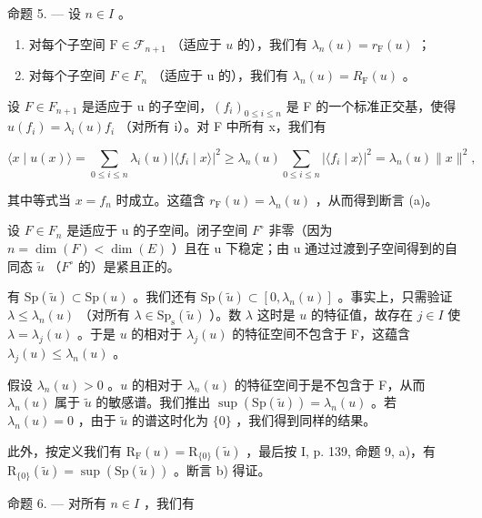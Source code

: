 命题 5. --- 设 \(n \in I\) 。

\begin{enumerate}
\def\labelenumi{\alph{enumi})}
\item
  对每个子空间 \(\mathrm{F} \in \mathcal{F}_{n+1}\) （适应于 \(u\) 的），我们有 \(\lambda_n(u) = r_{\mathrm{F}}(u)\) ；
\item
  对每个子空间 \(F \in F_{n}\) （适应于 u 的），我们有 \(\lambda_{n}(u) = R_{\mathrm{F}}(u)\) 。
\end{enumerate}

设 \(F \in F_{n+1}\) 是适应于 u 的子空间，\((f_i)_{0 \leqslant i \leqslant n}\) 是 F 的一个标准正交基，使得 \(u(f_i) = \lambda_i(u)f_i\) （对所有 i）。对 F 中所有 x，我们有

\[
\langle x \mid u (x) \rangle = \sum_ {0 \leqslant i \leqslant n} \lambda_ {i} (u) | \langle f _ {i} \mid x \rangle | ^ {2} \geqslant \lambda_ {n} (u) \sum_ {0 \leqslant i \leqslant n} | \langle f _ {i} \mid x \rangle | ^ {2} = \lambda_ {n} (u) \| x \| ^ {2},
\]

其中等式当 \(x = f_{n}\) 时成立。这蕴含 \(r_{\mathrm{F}}(u) = \lambda_{n}(u)\) ，从而得到断言 (a)。

设 \(F \in F_{n}\) 是适应于 u 的子空间。闭子空间 \(F^{\circ}\) 非零（因为 \(n = \dim(F) < \dim(E)\) ）且在 u 下稳定；由 u 通过过渡到子空间得到的自同态 \(\widetilde{u}\) （\(F^{\circ}\) 的）是紧且正的。

有 \(\mathrm{Sp}(\widetilde{u})\subset \mathrm{Sp}(u)\) 。我们还有 \(\mathrm{Sp}(\widetilde{u})\subset [0,\lambda_n(u)]\) 。事实上，只需验证 \(\lambda \leqslant \lambda_{n}(u)\) （对所有 \(\lambda \in \mathrm{Sp}_{\mathrm{s}}(\widetilde{u})\) ）。数 \(\lambda\) 这时是 \(u\) 的特征值，故存在 \(j\in I\) 使 \(\lambda = \lambda_j(u)\) 。于是 \(u\) 的相对于 \(\lambda_{j}(u)\) 的特征空间不包含于 F，这蕴含 \(\lambda_{j}(u)\leqslant \lambda_{n}(u)\) 。

假设 \(\lambda_n(u) > 0\) 。\(u\) 的相对于 \(\lambda_n(u)\) 的特征空间于是不包含于 F，从而 \(\lambda_n(u)\) 属于 \(\widetilde{u}\) 的敏感谱。我们推出 \(\sup (\mathrm{Sp}(\widetilde{u})) = \lambda_n(u)\) 。若 \(\lambda_n(u) = 0\) ，由于 \(\widetilde{u}\) 的谱这时化为 \(\{0\}\) ，我们得到同样的结果。

此外，按定义我们有 \(\mathrm{R}_{\mathrm{F}}(u)=\mathrm{R}_{\{0\}}(\widetilde{u})\) ，最后按 I, p. 139, 命题 9, a)，有 \(\mathrm{R}_{\{0\}}(\widetilde{u})=\sup(\mathrm{Sp}(\widetilde{u}))\) 。断言 b) 得证。

命题 6. --- 对所有 \(n \in I\) ，我们有

